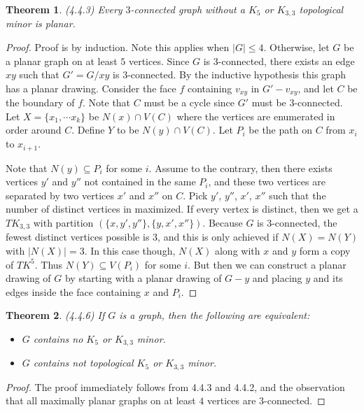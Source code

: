 \documentclass[12pt]{article}
\newtheorem{theorem}{Theorem}
\begin{document}
\begin{theorem} (4.4.3) Every $3$-connected graph without a $K_5$ or
  $K_{3,3}$ topological minor is planar.
\end{theorem}
\begin{proof} Proof is by induction. Note this applies when
  $|G| \leq 4$. Otherwise, let $G$ be a planar graph on at least $5$
  vertices. Since $G$ is $3$-connected, there exists an edge $xy$ such
  that $G'=G/xy$ is $3$-connected. By the inductive hypothesis this
  graph has a planar drawing. Consider the face $f$ containing
  $v_{xy}$ in $G'-v_{xy}$, and let $C$ be the boundary of $f$. Note
  that $C$ must be a cycle since $G'$ must be $3$-connected. Let
  $X = \{ x_1, \cdots x_k\}$ be $N(x) \cap V(C)$ where the vertices
  are enumerated in order around $C$. Define $Y$ to be
  $N(y) \cap V(C)$. Let $P_i$ be the path on $C$ from $x_i$ to
  $x_{i + 1}$.

  Note that $N(y) \subseteq P_i$ for some $i$. Assume to the contrary,
  then there exists vertices $y'$ and $y''$ not contained in the same
  $P_i$, and these two vertices are separated by two vertices $x'$ and
  $x''$ on $C$. Pick $y'$, $y''$, $x'$, $x''$ such that the number of
  distinct vertices in maximized. If every vertex is distinct, then we
  get a $TK_{3,3}$ with partition $(\{x, y', y''\}, \{y, x',
  x''\})$. Because $G$ is $3$-connected, the fewest distinct vertices
  possible is $3$, and this is only achieved if $N(X) = N(Y)$ with
  $|N(X)| = 3$. In this case though, $N(X)$ along with $x$ and $y$
  form a copy of $TK^5$. Thus $N(Y) \subseteq V(P_i)$ for some
  $i$. But then we can construct a planar drawing of $G$ by starting
  with a planar drawing of $G-y$ and placing $y$ and its edges inside
  the face containing $x$ and $P_i$.
\end{proof}

\begin{theorem} (4.4.6) If $G$ is a graph, then the following are
  equivalent:
  \begin{itemize}
  \item $G$ contains no $K_5$ or $K_{3,3}$ minor.
  \item $G$ contains not topological $K_5$ or $K_{3,3}$ minor.
  \end{itemize}
\end{theorem}
\begin{proof} The proof immediately follows from 4.4.3 and 4.4.2, and
  the observation that all maximally planar graphs on at least $4$
  vertices are $3$-connected.
\end{proof}
\end{document}
